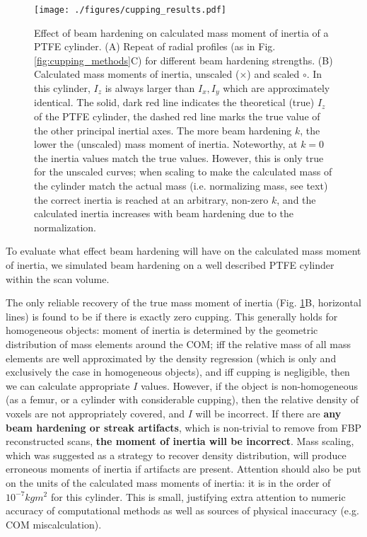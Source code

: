 \begin{figure}[htbp]
\centering
\texttt{[image: ./figures/cupping\_results.pdf]}
\caption{\label{fig:cupping_results}Effect of beam hardening on calculated mass moment of inertia of a PTFE cylinder. (A) Repeat of radial profiles (as in Fig. \ref{fig:cupping_methods}C) for different beam hardening strengths. (B) Calculated mass moments of inertia, unscaled (\(\times\)) and scaled \(\circ\). In this cylinder, \(I_z\) is always larger than \(I_x, I_y\) which are approximately identical. The solid, dark red line indicates the theoretical (true) \(I_z\) of the PTFE cylinder, the dashed red line marks the true value of the other principal inertial axes. The more beam hardening \(k\), the lower the (unscaled) mass moment of inertia. Noteworthy, at \(k=0\) the inertia values match the true values. However, this is only true for the unscaled curves; when scaling to make the calculated mass of the cylinder match the actual mass (i.e. normalizing mass, see text) the correct inertia is reached at an arbitrary, non-zero \(k\), and the calculated inertia increases with beam hardening due to the normalization.}
\end{figure}

To evaluate what effect beam hardening will have on the calculated mass moment of inertia, we simulated beam hardening on a well described PTFE cylinder within the scan volume.

The only reliable recovery of the true mass moment of inertia (Fig. \ref{fig:cupping_results}B, horizontal lines) is found to be if there is exactly zero cupping.
This generally holds for homogeneous objects: moment of inertia is determined by the geometric distribution of mass elements around the COM; iff the relative mass of all mass elements are well approximated by the density regression (which is only and exclusively the case in homogeneous objects), and iff cupping is negligible, then we can calculate appropriate \(I\) values.
However, if the object is non-homogeneous (as a femur, or a cylinder with considerable cupping), then the relative density of voxels are not appropriately covered, and \(I\) will be incorrect.
If there are \textbf{any beam hardening or streak artifacts}, which is non-trivial to remove from FBP reconstructed scans, \textbf{the moment of inertia will be incorrect}.
Mass scaling, which was suggested as a strategy to recover density distribution, will produce erroneous moments of inertia if artifacts are present.
Attention should also be put on the units of the calculated mass moments of inertia: it is in the order of \(10^{-7} kg m^2\) for this cylinder.
This is small, justifying extra attention to numeric accuracy of computational methods as well as sources of physical inaccuracy (e.g. COM miscalculation).


